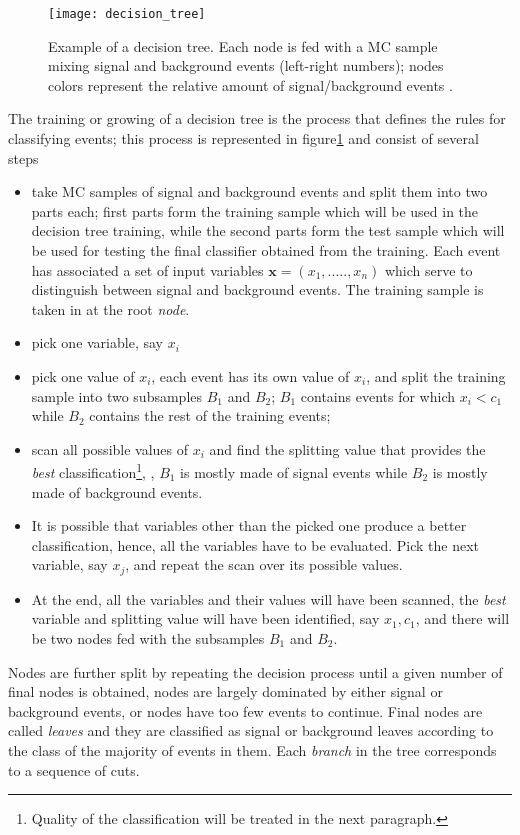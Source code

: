\begin{figure}[!h]
  \centering
  \texttt{[image: decision\_tree]}
  \caption[Decision tree.]{Example of a decision tree. Each node is fed with a MC sample mixing signal and background events (left-right numbers); nodes colors represent the relative amount of signal/background events \cite{luca}.}\label{fig:dt}
\end{figure}

The training or growing of a decision tree is the process that defines the rules for classifying events; this process is represented in figure\ref{fig:dt} and consist of several steps

\begin{itemize}
\item take MC samples of signal and background events and split them into two parts each; first parts form the training sample which will be used in the decision tree training, while the second parts form the test sample which will be used for testing the final classifier obtained from the training. Each event has associated a set of input variables $\textbf{x}=(x_1,.....,x_n)$ which serve to distinguish between signal and background events. The training sample is taken in at the root \textit{node}. 
\item pick one variable, say $x_i$
\item pick one value of $x_i$, each event has its own value of $x_i$, and split the training sample into two subsamples $B_1$ and $B_2$; $B_1$ contains events for which $x_i< c_1$ while $B_2$ contains the rest of the training events;
\item scan all possible values of $x_i$ and find the splitting value that provides the \textit{best} classification\footnote{ Quality of the classification will be treated in the next paragraph.}, \ie, $B_1$ is mostly made of signal events while $B_2$ is mostly made of background events.
\item It is possible that variables other than the picked one produce a better classification, hence, all the variables have to be evaluated. Pick the next variable, say $x_j$, and repeat the scan over its possible values.
\item At the end, all the variables and their values will have been scanned, the \textit{best} variable and splitting value will have been identified, say $x_1, c_1$, and there will be two nodes fed with the subsamples $B_1$ and $B_2$. 
\end{itemize}

Nodes are further split by repeating the decision process until a given number of final nodes is obtained, nodes are largely dominated by either signal or background events, or nodes have too few events to continue. Final nodes are called \textit{leaves} and they are classified as signal or background leaves according to the class of the majority of events in them. Each \textit{branch} in the tree corresponds to a sequence of cuts. 

